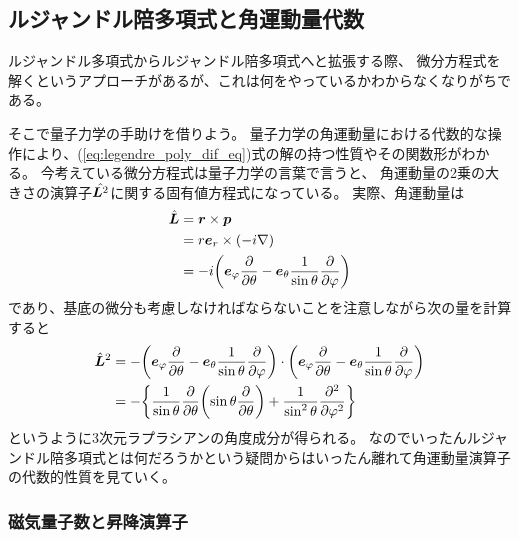 \documentclass[../../master.tex]{subfiles}
\begin{document}
\subsection{ルジャンドル陪多項式と角運動量代数}
ルジャンドル多項式からルジャンドル陪多項式へと拡張する際、
微分方程式を解くというアプローチがあるが、これは何をやっているかわからなくなりがちである。

そこで量子力学の手助けを借りよう。
量子力学の角運動量における代数的な操作により、(\ref{eq:legendre_poly_dif_eq})式の解の持つ性質やその関数形がわかる。
今考えている微分方程式は量子力学の言葉で言うと、
角運動量の2乗の大きさの演算子\(\hat{\vb*{L}^2}\)に関する固有値方程式になっている。
実際、角運動量は
\begin{align}
	\hat{\vb*{L}} & = \vb*{r} \times \vb*{p}                                                                 \\
	              & = r\vb*{e}_r \times \qty(-i\nabla)                                                       \\
	              & =-i\qty(\vb*{e}_{\varphi}\pdv{\theta}-\vb*{e}_{\theta}\frac{1}{\sin\theta}\pdv{\varphi})
\end{align}
であり、基底の微分も考慮しなければならないことを注意しながら次の量を計算すると
\begin{align}
	\hat{\vb*{L}}^2 & = -\qty(\vb*{e}_{\varphi}\pdv{\theta}-\vb*{e}_{\theta}\frac{1}{\sin\theta}\pdv{\varphi})\cdot\qty(\vb*{e}_{\varphi}\pdv{\theta}-\vb*{e}_{\theta}\frac{1}{\sin\theta}\pdv{\varphi}) \\
	                & = -\qty{\frac{1}{\sin\theta}\pdv{\theta}\qty(\sin\theta\pdv{\theta})+\frac{1}{\sin^2\theta}\pdv[2]{\varphi}}
\end{align}
というように3次元ラプラシアンの角度成分が得られる。
なのでいったんルジャンドル陪多項式とは何だろうかという疑問からはいったん離れて角運動量演算子の代数的性質を見ていく。

\subsubsection*{磁気量子数と昇降演算子}
\end{document}
